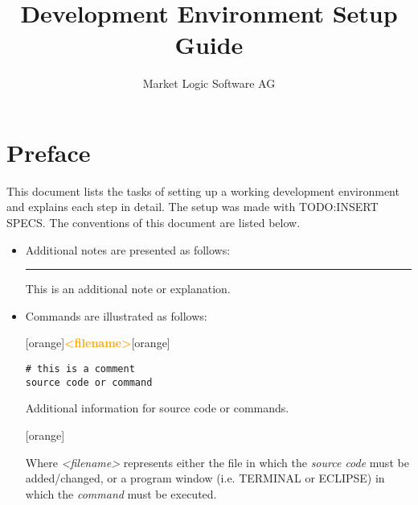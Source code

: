 \documentclass[10pt,a4paper]{article}
\begin{document}
\newcommand{\tip}{\rule{10pt}{10pt}\hspace{12pt}}

\newenvironment{command}[1]{\noindent\xrfill{2pt}[orange]\textcolor{orange}{\textbf{#1}}\xrfill{2pt}[orange]}{\noindent\xrfill{2pt}[orange]}

\newcommand{\codenote}[1]{\textcolor{codeNote}{#1}}
	
	
\title{Development Environment Setup Guide}
\author{Market Logic Software AG}
\maketitle
\thispagestyle{empty}
\newpage

\section*{Preface}
This document lists the tasks of setting up a working development environment and
explains each step in detail. The setup was made with TODO:INSERT SPECS. The conventions of this document are listed below.

\begin{itemize}
\item{}Additional notes are presented as follows:

\tip{}This is an additional note or explanation.
\vspace{\baselineskip}


\item{}Commands are illustrated as follows:

\begin{command}{<filename>}
\begin{lstlisting}
# this is a comment
source code or command
\end{lstlisting}
\codenote{Additional information for source code or commands.}

\end{command}

Where \textit{<filename>} represents either the file in which the \textit{source code} must be added/changed, or a program window (i.e. TERMINAL or ECLIPSE) in which the \textit{command} must be executed.

\end{itemize}
\end{document}
